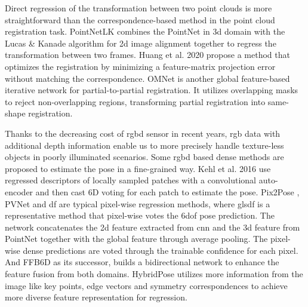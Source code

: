 \documentclass[12pt,DIV14,BCOR12mm,a4paper,footinclude=false,headinclude,parskip=half-,twoside,openright,cleardoublepage=empty,toc=index,bibliography=totoc,listof=totoc]{scrreprt}
\numberwithin{equation}{chapter}
\begin{document}
Direct regression of the transformation between two point clouds is more straightforward than the correspondence-based method in the point cloud registration task. PointNetLK \cite{aoki2019pointnetlk} combines the PointNet in \gls{3d} domain with the Lucas \& Kanade algorithm \cite{Lucas1981AnII} for \gls{2d} image alignment together to regress the transformation between two frames. Huang et al. 2020 \cite{huang2020featuremetric} propose a method that optimizes the registration by minimizing a feature-matrix projection error without matching the correspondence. OMNet \cite{xu2021omnet} is another global feature-based iterative network for partial-to-partial registration. It utilizes overlapping masks to reject non-overlapping regions, transforming partial registration into same-shape registration.

Thanks to the decreasing cost of \gls{rgbd} sensor in recent years, \gls{rgb} data with additional depth information enable us to more precisely handle texture-less objects in poorly illuminated scenarios. Some \gls{rgbd} based dense methods are proposed to estimate the pose in a fine-grained way. Kehl et al. 2016 \cite{kehl2016deep} use regressed descriptors of locally sampled patches with a convolutional auto-encoder and then cast 6D voting for each patch to estimate the pose. Pix2Pose \cite{Park_2019}, PVNet \cite{peng_pvnet_2019} and \gls{df} \cite{wang2019densefusion} are typical pixel-wise regression methods, where gls{df} is a representative method that pixel-wise votes the \gls{6dof} pose prediction. The network concatenates the \gls{2d} feature extracted from \gls{cnn} and the \gls{3d} feature from PointNet together with the global feature through average pooling. The pixel-wise dense predictions are voted through the trainable confidence for each pixel. And FFB6D \cite{he2021ffb6d} as its successor, builds a bidirectional network to enhance the feature fusion from both domains. HybridPose \cite{song2020hybridpose} utilizes more information from the image like key points, edge vectors and symmetry correspondences to achieve more diverse feature representation for regression.
\end{document}
